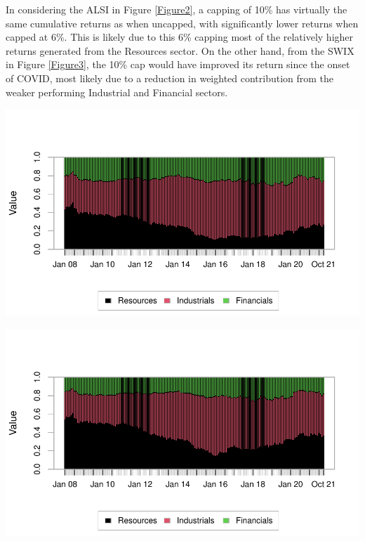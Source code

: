 \documentclass[11pt,preprint, authoryear]{elsarticle}
\let\origfigure\figure
\let\endorigfigure\endfigure
\renewenvironment{figure}[1][2] {
    \expandafter\origfigure\expandafter[H]
} {
    \endorigfigure
}
\numberwithin{equation}{section}
\numberwithin{figure}{section}
\numberwithin{table}{section}
\begin{document}
In considering the ALSI in Figure \ref{Figure2}, a capping of 10\% has
virtually the same cumulative returns as when uncapped, with
significantly lower returns when capped at 6\%. This is likely due to
this 6\% capping most of the relatively higher returns generated from
the Resources sector. On the other hand, from the SWIX in Figure
\ref{Figure3}, the 10\% cap would have improved its return since the
onset of COVID, most likely due to a reduction in weighted contribution
from the weaker performing Industrial and Financial sectors.

\begin{figure}[H]

{\centering \includegraphics{Question3_files/figure-latex/ALSI weights plot-1} 

}

\caption{Dynamic Weight Contribution to ALSI Portfolio Per Sector. \label{Figure2}}\label{fig:ALSI weights plot}
\end{figure}

\begin{figure}[H]

{\centering \includegraphics{Question3_files/figure-latex/SWIX weights plot-1} 

}

\caption{Dynamic Weight Contribution to SWIX Portfolio. \label{Figure3}}\label{fig:SWIX weights plot}
\end{figure}
\end{document}
